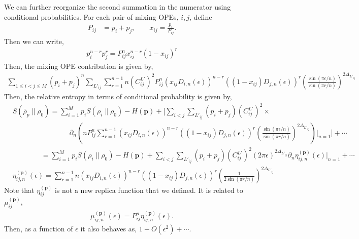 \documentclass[11pt]{article}
\newcommand{\ep}{\epsilon}
\newcommand{\p}{\partial}
\newcommand{\nn}{\nonumber}
\newcommand{\lb}{\left(}
\newcommand{\rb}{\right)}
\begin{document}
We can further  reorganize the second summation in the numerator using conditional probabilities. For each pair of mixing OPEs, $i,j$, define 
\begin{align}
    P_{ij} &= p_i + p_j, \qquad
    x_{ij} = \frac{p_i}{P_{ij}}.
\end{align}
Then we can write,
\begin{align}
    p_i^{n-r}p_j^r = P_{ij}^n x_{ij}^{n-r}(1-x_{ij})^r
\end{align}
Then, the mixing OPE contribution is given by,
\begin{align}
    \sum_{1\leq i<j\leq M}(p_i + p_j)^n\sum_{L'_{ij}}\sum_{r=1}^{n-1}n \lb C_{ij}^{L'}\rb^2 P_{ij}^n \lb x_{ij}D_{i,n}(\ep)\rb^{n-r}\lb (1-x_{ij})D_{j,n}(\ep)\rb^r \lb\frac{\sin (\pi \ep/n)}{\sin (\pi r/n)}\rb^{2\Delta_{L'_{ij}}}
\end{align}
Then, the relative entropy in terms of conditional probability is given by,
\begin{align}
    &S(\bar{\rho}_p\| \rho_0) = \sum_{i=1}^M p_i S(\rho_i \|\rho_0)-  H(\textbf{p})+ \Bigg[\sum_{i<j}\sum_{L'_{ij}}(p_i + p_j)  \lb C_{ij}^{L'}\rb^2 \times\nn \\&
    \qquad\qquad \qquad\qquad \p_n\lb nP_{ij}^n\sum_{r=1}^{n-1}  \lb x_{ij}D_{i,n}(\ep)\rb^{n-r}\lb(1-x_{ij})D_{j,n}(\ep)\rb^r \lb\frac{\sin (\pi \ep/n)}{\sin (\pi r/n)}\rb^{2\Delta_{L'_{ij}}} \rb\Bigg|_{n=1}\Bigg]+\cdots \\
    &\qquad\qquad = \sum_{i=1}^M p_i S(\rho_i \|\rho_0) - H(\textbf{p}) + \sum_{i<j}\sum_{L'_{ij}}(p_i + p_j) \lb C_{ij}^{L'}\rb^2 (2\pi\ep)^{2\Delta_{L'_{ij}}} \p_n \eta_{ij,n}^{(\textbf{p})} \lb \ep\rb\Bigg|_{n=1}+\cdots \\
    &\eta_{ij,n}^{(\textbf{p})} \lb \ep\rb =  \sum_{r=1}^{n-1}  n\lb x_{ij}D_{i,n}(\ep)\rb^{n-r}\lb(1-x_{ij})D_{j,n}(\ep)\rb^r\lb\frac{1}{2\sin (\pi r/n)}\rb^{2\Delta_{L'_{ij}}} 
\end{align}
Note that $\eta_{ij}^{(\textbf{p})}$ is not a new replica function that we defined. It is related to $\mu_{ij}^{(\textbf{p})}$,
\begin{align}
    \mu_{ij,n}^{(\textbf{p})}\lb \ep\rb = P_{ij}^n\eta_{ij,n}^{(\textbf{p})} \lb \ep\rb .
\end{align}
Then, as a function of $\ep$ it also behaves as, 
$1+ O(\ep^2) + \cdots$. 
\end{document}
